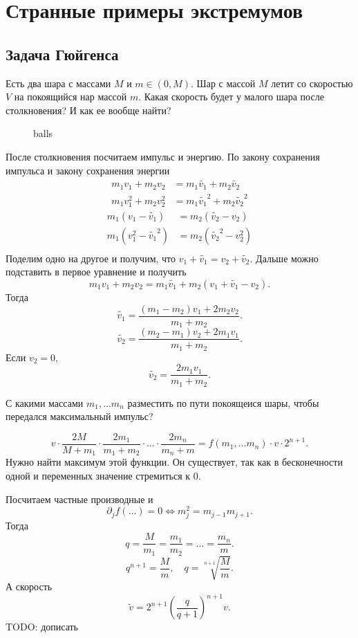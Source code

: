 \documentclass[11pt,dvipsnames]{report}
\begin{document}
\section{Странные примеры экстремумов}
\subsection{Задача Гюйгенса}
\begin{desc}
    Есть два шара с массами $ M$ и $ m \in (0, M)$. Шар с массой $ M$ летит со скоростью  $ V$ на покоящийся нар массой  $ m$. Какая скорость будет у малого шара после столкновения? И как ее вообще найти?
\end{desc}
\begin{figure}[ht]
    \centering
    \caption{balls}
    \label{fig:balls}
\end{figure}
После столкновения посчитаем импульс и энергию.
По закону сохранения импульса и закону сохранения энергии
\begin{align*}
    m_1v_1 + m_2v_2 &= m_1 \widetilde{ v_1} + m_2 \widetilde{ v_2} \\
m_1v_1^2 + m_2v_2^2 &= m_1 \widetilde{ v_1}^2 + m_2 \widetilde{ v_2}^2 
\end{align*}
\begin{align*}
    m_1(v_1-\widetilde{ v_1} ) &= m_2(\widetilde{ v_2} -v_2)\\
    m_1(v_1^2-\widetilde{ v_1}^2 ) &= m_2(\widetilde{ v_2}^2 -v_2^2)\\
\end{align*}
Поделим одно на другое и получим, что $ v_1+\widetilde{ v_1} = v_2+\widetilde{ v_2}  $.
Дальше можно подставить в первое уравнение и получить
\[
    m_1v_1+ m_2v_2 =m_1 \widetilde{ v_1} +m_2(v_1+ \widetilde{ v_1} -v_2)
.\] 
Тогда
\[
    \widetilde{ v_1}= \frac{(m_1-m_2)v_1 +2m_2v_2}{m_1+m_2}
.\] 
\[
    \widetilde{ v_2}= \frac{(m_2-m_1)v_2 +2m_1v_1}{m_1+m_2}
.\] 
Если $ v_2=0$, 
\[
    \widetilde{ v_2} = \frac{2m_1v_1}{m_1+m_2} 
.\] 
\begin{defn}
    С какими массами $ m_1, \ldots m_n$ разместить по пути покоящеися шары, чтобы передался максимальный импульс?
\end{defn}
\[
    v \cdot  \frac{2M}{M+m_1} \cdot  \frac{2m_1}{m_1+m_2} \cdot \ldots \cdot \frac{2m_n}{m_n +m} = f(m_1, \ldots m_n) \cdot v \cdot 2^{n+1}
.\] 
Нужно найти максимум этой функции. Он существует, так как в бесконечности  одной и переменных значение стремиться к 0.

Посчитаем частные производные и 
\[
    \partial _j f(\ldots ) = 0 \Longleftrightarrow  m_j^2=m_{j-1}m_{j+1}
.\] 
Тогда 
\[
q =     \frac{M}{m_1}= \frac{m_1}{m_2} = \ldots = \frac{m_n}{m}
.\] 
 \[
     q^{n+1} = \frac{M}{m}, \quad q = \sqrt[n+1]{\frac{M}{m}}
 .\] 
 А скорость
 \[
     \widetilde{ v} = 2^{n+1} \left( \frac{q}{q+1} \right) ^{n+1} v
 .\] 
 TODO: дописать
\end{document}
